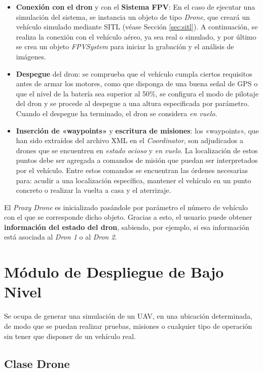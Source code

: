 \begin{itemize}
\item \textbf{Conexión con el dron} y con el \textbf{Sistema \acs{FPV}}: En el caso de ejecutar una simulación del sistema, se instancia un objeto de tipo \textit{Drone}, que creará un vehículo simulado mediante \acs{SITL} (véase Sección \ref{sec:sitl}). A continuación, se realiza la conexión con el vehículo aéreo, ya sea real o simulado, y por último se crea un objeto \textit{FPVSystem} para iniciar la grabación y el análisis de imágenes.
\item \textbf{Despegue} del dron: se comprueba que el vehículo cumpla ciertos requisitos antes de armar los motores, como que disponga de una buena señal de \acs{GPS} o que el nivel de la batería sea superior al 50\%, se configura el modo de pilotaje del dron y se procede al despegue a una altura especificada por parámetro. Cuando el despegue ha terminado, el dron se considera \textit{en vuelo}. 
\item \textbf{Inserción de «waypoints»} y \textbf{escritura de misiones}: los «waypoints», que han sido extraídos del archivo XML en el \textit{Coordinator}, son adjudicados a drones que se encuentren en \textit{estado ocioso} y \textit{en vuelo}. La localización de estos puntos debe ser agregada a comandos de misión que puedan ser interpretados por el vehículo. Entre estos comandos se encuentran las órdenes necesarias para: acudir a una localización específica, mantener el vehículo en un punto concreto o realizar la vuelta a casa y el aterrizaje.
\end{itemize}

El \textit{Proxy Drone} es inicializado pasándole por parámetro el número de vehículo con el que se corresponde dicho objeto. Gracias a esto, el usuario puede obtener \textbf{información del estado del dron}, sabiendo, por ejemplo, si esa información está asociada al \textit{Dron 1} o al \textit{Dron 2}.

\clearpage

\section{Módulo de Despliegue de Bajo Nivel}

Se ocupa de generar una simulación de un \acs{UAV}, en una ubicación determinada, de modo que se puedan realizar pruebas, misiones o cualquier tipo de operación sin tener que disponer de un vehículo real.

\subsection{Clase Drone}

